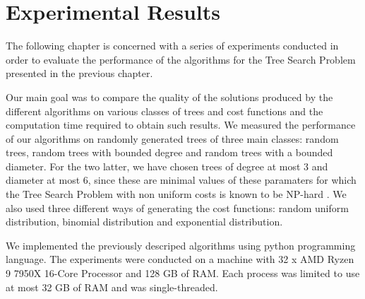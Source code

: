\chapter{Experimental Results}

The following chapter is concerned with a series of experiments conducted in order to evaluate the performance of the algorithms for the Tree Search Problem presented in the previous chapter.

Our main goal was to compare the quality of the solutions produced by the different algorithms on various classes of trees and cost functions and the computation time required to obtain such results. We measured the performance of our algorithms on randomly generated trees of three main classes: random trees, random trees with bounded degree and random trees with a bounded diameter. For the two latter, we have chosen trees of degree at most 3 and diameter at most 6, since these are minimal values of these paramaters for which the Tree Search Problem with non uniform costs is known to be NP-hard \cite{Cicalese2012BinIdentPForWTs}. We also used three different ways of generating the cost functions: random uniform distribution, binomial distribution and exponential distribution.

We implemented the previously descriped algorithms using python programming language. The experiments were conducted on a machine with 32 x AMD Ryzen 9 7950X 16-Core Processor and 128 GB of RAM. Each process was limited to use at most 32 GB of RAM and was single-threaded.
